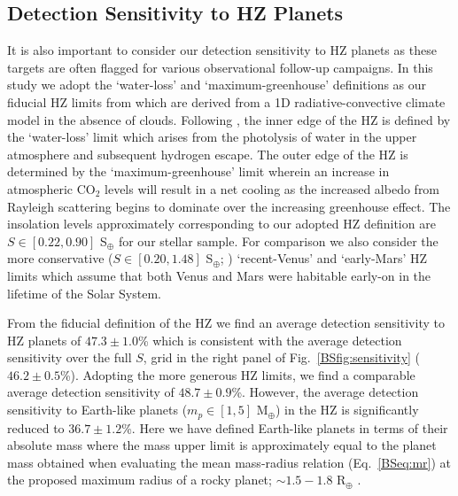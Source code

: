 \subsection{Detection Sensitivity to HZ Planets}
It is also important to consider our detection sensitivity to HZ planets as these targets are often
flagged for various observational follow-up campaigns. In this study we adopt the `water-loss' and
`maximum-greenhouse' definitions
as our fiducial HZ limits from \cite{kopparapu13} which are derived from a 1D radiative-convective
climate model in the absence of clouds. Following \cite{kasting93}, the inner edge of the HZ is defined
by the `water-loss' limit which arises from the photolysis of water in the upper atmosphere and subsequent
hydrogen escape. The outer edge of the HZ is determined by the `maximum-greenhouse' limit wherein an
increase in atmospheric CO$_2$ levels will result in a net cooling as the increased albedo from Rayleigh
scattering begins to dominate over the increasing greenhouse effect. The insolation levels 
approximately corresponding to our adopted HZ definition are $S \in [0.22,0.90]$ S$_{\oplus}$ for our
stellar sample. For comparison we
also consider the more conservative ($S \in [0.20,1.48]$ S$_{\oplus}$; \citealt{kopparapu13})
`recent-Venus' and `early-Mars' HZ limits which assume that both Venus and Mars were habitable early-on
in the lifetime of the Solar System.

From the fiducial definition of the HZ we find an average
detection sensitivity to HZ planets of $47.3 \pm 1.0$\% which is consistent with the average
detection sensitivity over the full $S$,\msini{} grid in the right panel
of Fig.~\ref{BSfig:sensitivity}
($46.2 \pm 0.5$\%). Adopting the more generous HZ limits, we find a comparable average
detection sensitivity of $48.7 \pm 0.9$\%.
However, the average detection sensitivity to Earth-like planets ($m_p \in [1,5]$ M$_{\oplus}$) in the HZ
is significantly reduced to $36.7 \pm 1.2$\%. Here we have defined Earth-like planets in terms of their
absolute mass where the mass upper limit is approximately equal to 
the planet mass obtained when evaluating the mean mass-radius relation (Eq.~\ref{BSeq:mr}) at the
proposed maximum radius of a rocky planet; $\sim 1.5-1.8$ R$_{\oplus}$ \citep{weiss14, rogers15, fulton17}.

